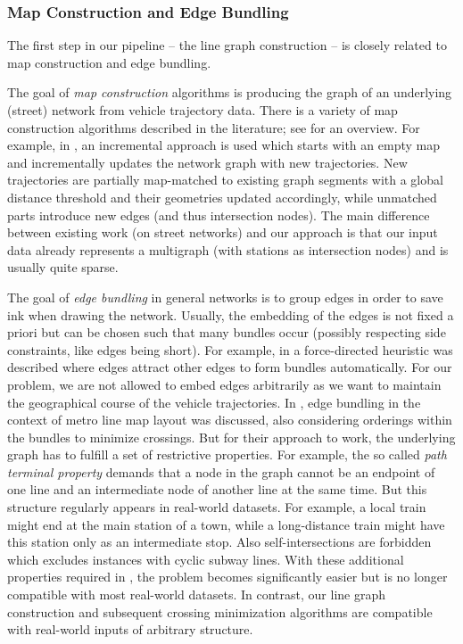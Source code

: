 \documentclass[sigconf]{acmart}
\begin{document}
\subsubsection{Map Construction and Edge Bundling}

The first step in our pipeline -- the line graph construction -- is closely related to map construction and edge bundling. 

The goal of  \emph{map construction} algorithms is producing the graph of an underlying (street) network from vehicle trajectory data. There is a variety of map construction algorithms described in the literature; see \cite{ahm15} for an overview. For example, in \cite{ahm12}, an incremental approach is used which starts with an empty map and incrementally updates the network graph with new trajectories. New trajectories are partially map-matched to existing graph segments with a global distance threshold and their geometries updated accordingly, while unmatched parts introduce new edges (and thus intersection nodes). The main difference between existing work (on street networks) and our approach is that our input data already represents a multigraph (with stations as intersection nodes) and is usually quite sparse. 

The goal of \emph{edge bundling} in general networks is to group edges in order to save ink when drawing the network. Usually, the embedding of the edges is not fixed a priori but can be chosen such that many bundles occur (possibly respecting side constraints, like edges being short). For example, in \cite{hol09} a force-directed heuristic was described where edges attract other edges to form bundles automatically. For our problem, we are not allowed to embed edges arbitrarily as we want to maintain the geographical course of the vehicle trajectories. In \cite{pup11}, edge bundling in the context of metro line map layout was discussed, also considering orderings within the bundles to minimize crossings. But for their approach to work, the underlying graph has to fulfill a set of restrictive properties. For example, the so called \emph{path terminal property} demands that a node in the graph cannot be an endpoint of one line and an intermediate node of another line at the same time. But this structure regularly appears in real-world datasets. For example, a local train might end at the main station of a town, while a long-distance train might have this station only as an intermediate stop. Also self-intersections are forbidden which excludes instances with cyclic subway lines. With these additional properties required in \cite{pup11}, the problem becomes significantly easier but is no longer compatible with most real-world datasets. In contrast, our line graph construction and subsequent crossing minimization algorithms are compatible with real-world inputs of arbitrary structure.
\end{document}
